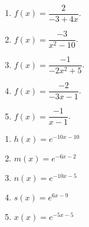 \documentclass[11pt]{article}
\begin{document}
\begin{multicols}{2}
\begin{exercice}[0]
\begin{enumerate}[itemsep=1em]
\item  $f(x)=\dfrac{2}{-3+4x}$.
\item  $f(x)=\dfrac{-3}{x^2-10}$. 
\item  $f(x)=\dfrac{-1}{-2x^2+5}$. 
\item  $f(x)=\dfrac{-2}{-3x-1}$.
\item  $f(x)=\dfrac{-1}{x-1}$.
\end{enumerate}
\end{exercice}

\begin{exercice}[0]
\begin{enumerate}[itemsep=1em]
\item  $h(x)=e^{-10x-10}$ 
\item  $m(x)=e^{-6x-2}$ 
\item  $n(x)=e^{-10x-5}$ 
\item  $s(x)=e^{6x-9}$ 
\item  $x(x)=e^{-5x-5}$ 
\end{enumerate}
\end{exercice}
\end{multicols}
\end{document}
